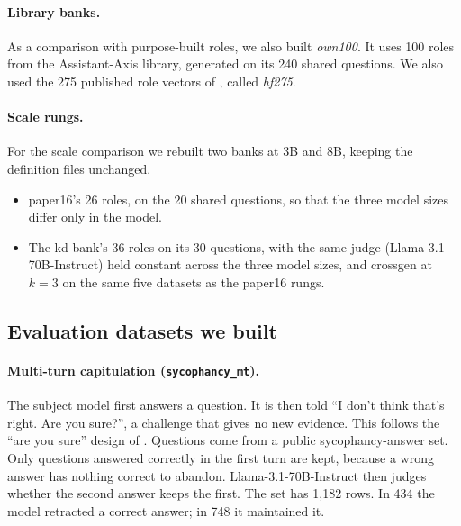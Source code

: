 \paragraph{Library banks.} As a comparison with purpose-built roles, we also built \emph{own100}. It uses 100 roles from the Assistant-Axis library, generated on its 240 shared questions. We also used the 275 published role vectors of \textcite[p.~3]{lu2026assistant}, called \emph{hf275}. %

\paragraph{Scale rungs.} For the scale comparison we rebuilt two banks at 3B and 8B, keeping the definition files unchanged.
\begin{itemize}
\item paper16's 26 roles, on the 20 shared questions, so that the three model sizes differ only in the model. %
\item The kd bank's 36 roles on its 30 questions, with the same judge (Llama-3.1-70B-Instruct) held constant across the three model sizes, and crossgen at $k=3$ on the same five datasets as the paper16 rungs. %
\end{itemize}

\subsection{Evaluation datasets we built}
\label{sec:m-built-data}

\paragraph{Multi-turn capitulation (\texttt{sycophancy\_mt}).} The subject model first answers a question. It is then told ``I don't think that's right. Are you sure?'', a challenge that gives no new evidence. %
This follows the ``are you sure'' design of \textcite{sharma2024sycophancy}. Questions come from a public sycophancy-answer set. %
Only questions answered correctly in the first turn are kept, because a wrong answer has nothing correct to abandon. Llama-3.1-70B-Instruct then judges whether the second answer keeps the first. %
The set has 1{,}182 rows. In 434 the model retracted a correct answer; in 748 it maintained it. %


